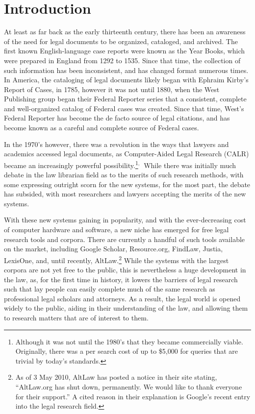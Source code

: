 \label{intro}
\section{Introduction}
At least as far back as the early thirteenth century, there has been an awareness of the need for legal documents to be organized, cataloged, and archived. The first known English-language case reports were known as the Year Books, which were prepared in England from 1292 to 1535.\cite{berring_legal_1987} Since that time, the collection of such information has been inconsistent, and has changed format numerous times. 
In America, the cataloging of legal documents likely began with Ephraim Kirby's Report of Cases,\cite{kirby_reports_1788} in 1785, however it was not until 1880, when the West Publishing group began their Federal Reporter series that a consistent, complete and well-organized catalog of Federal cases was created. Since that time, West's Federal Reporter has become the de facto source of legal citations, and has become known as a careful and complete source of Federal cases. 

In the 1970's however, there was a revolution in the ways that lawyers and academics accessed legal documents, as Computer-Aided Legal Research (CALR) became an increasingly powerful possibility.\footnote{Although it was not until the 1980's that they became commercially viable. Originally, there was a per search cost of up to \$5,000 for queries that are trivial by today's standards.}$^{\textrm{, }}$\cite{harrington_brief_1984} While there was initially much debate in the law librarian field as to the merits of such research methods, with some expressing outright scorn for the new systems, for the most part, the debate has subsided, with most researchers and lawyers accepting the merits of the new systems.

With these new systems gaining in popularity, and with the ever-decreasing cost of computer hardware and software, a new niche has emerged for free legal research tools and corpora. There are currently a handful of such tools available on the market, including Google Scholar, Resource.org, FindLaw, Justia, LexisOne, and, until recently, AltLaw.\footnote{As of 3 May 2010, AltLaw has posted a notice in their site stating, ``AltLaw.org has shut down, permanently. We would like to thank everyone for their support.'' A cited reason in their explanation is Google's recent entry into the legal research field.}
While the systems with the largest corpora are not yet free to the public, this is nevertheless a huge development in the law, as, for the first time in history, it lowers the barriers of legal research such that lay people can easily complete much of the same research as professional legal scholars and attorneys. As a result, the legal world is opened widely to the public, aiding in their understanding of the law, and allowing them to research matters that are of interest to them.

